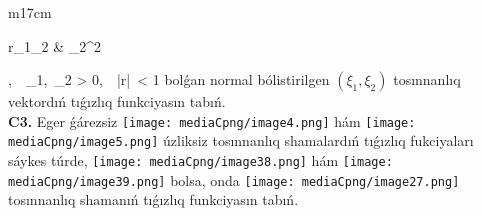 \documentclass{article}
\begin{document}
\begin{tabular}{m{17cm}}
\begin{pmatrix}
r\sigma_{1}\sigma_{2} & \sigma_{2}^{2}
\end{pmatrix},\ \ \sigma_{1},\ \sigma_{2} > 0,\ \ |r|\  < 1\) bolǵan normal bólistirilgen \(\left( \xi_{1},\xi_{2} \right)\) tosınnanlıq vektordıń tıǵızlıq funkciyasın tabıń.
 \\
\textbf{C3.} Eger ǵárezsiz \texttt{[image: mediaCpng/image4.png]} hám \texttt{[image: mediaCpng/image5.png]} úzliksiz tosınnanlıq shamalardıń tıǵızlıq fukciyaları sáykes túrde,
\texttt{[image: mediaCpng/image38.png]} hám \texttt{[image: mediaCpng/image39.png]}
bolsa, onda \texttt{[image: mediaCpng/image27.png]} tosınnanlıq shamanıń tıǵızlıq funkciyasın tabıń.
 \\

\end{tabular}
\vspace{1cm}
\end{document}
